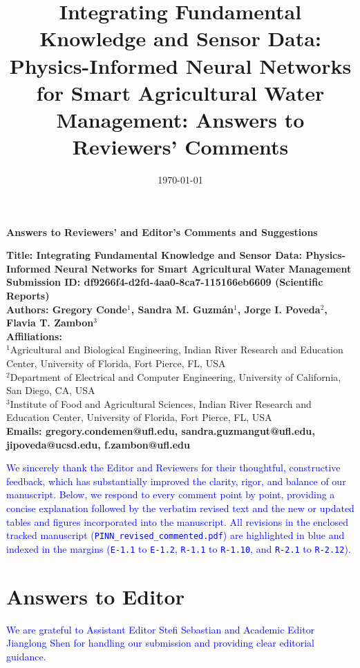 \documentclass[10pt]{article}
\title{Integrating Fundamental Knowledge and Sensor Data: Physics-Informed Neural Networks for Smart Agricultural Water Management: Answers to Reviewers' Comments}
\date{\today}
\begin{document}
\renewcommand{\figurename}{Fig.}
\sloppy
\begin{center}
\textbf{\Large Answers to Reviewers' and Editor's Comments and Suggestions}
\end{center}
\vspace{0.3cm}
\noindent
\textbf{Title: Integrating Fundamental Knowledge and Sensor Data: Physics-Informed Neural Networks for Smart Agricultural Water Management} \\
\textbf{Submission ID: df9266f4-d2fd-4aa0-8ca7-115166eb6609 (Scientific Reports)} \\
\textbf{Authors: Gregory Conde$^{1}$, Sandra M. Guzm\'an$^{1}$, Jorge I. Poveda$^{2}$, Flavia T. Zambon$^{3}$} \\
\textbf{Affiliations:} \\
$^{1}$Agricultural and Biological Engineering, Indian River Research and Education Center, University of Florida, Fort Pierce, FL, USA \\
$^{2}$Department of Electrical and Computer Engineering, University of California, San Diego, CA, USA \\
$^{3}$Institute of Food and Agricultural Sciences, Indian River Research and Education Center, University of Florida, Fort Pierce, FL, USA \\
\textbf{Emails: gregory.condemen@ufl.edu, sandra.guzmangut@ufl.edu, jipoveda@ucsd.edu, f.zambon@ufl.edu} \\
\vspace{0.1cm}
\setcounter{page}{1}

\textcolor{blue}{We sincerely thank the Editor and Reviewers for their thoughtful, constructive feedback, which has substantially improved the clarity, rigor, and balance of our manuscript. Below, we respond to every comment point by point, providing a concise explanation followed by the verbatim revised text and the new or updated tables and figures incorporated into the manuscript. All revisions in the enclosed tracked manuscript (\texttt{PINN\_revised\_commented.pdf}) are highlighted in blue and indexed in the margins (\texttt{E-1.1} to \texttt{E-1.2}, \texttt{R-1.1} to \texttt{R-1.10}, and \texttt{R-2.1} to \texttt{R-2.12}).}

\section*{Answers to Editor}

\textcolor{blue}{We are grateful to Assistant Editor Stefi Sebastian and Academic Editor Jianglong Shen for handling our submission and providing clear editorial guidance.}
\end{document}
